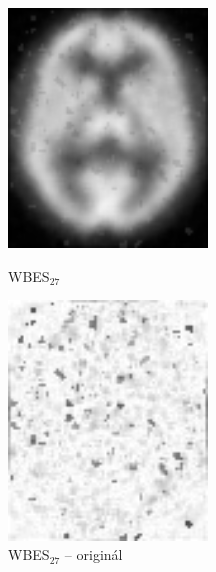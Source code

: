     \vfill
    \newpage
    ~\vfill~
    \begin{figure}[htp]
        \begin{minipage}[l]{0.5\textwidth}
            \center
            \includegraphics[width = 150pt]{src/8Appendix/final/10-100wbes.png}
            \caption{WBES$_{27}$}
        \end{minipage}
        \begin{minipage}[r]{0.5\textwidth}
            \center
            \includegraphics[width = 150pt]{src/8Appendix/final/10-100wbesD.png}
            \caption{WBES$_{27}$ -- originál}
        \end{minipage}
    \end{figure}

